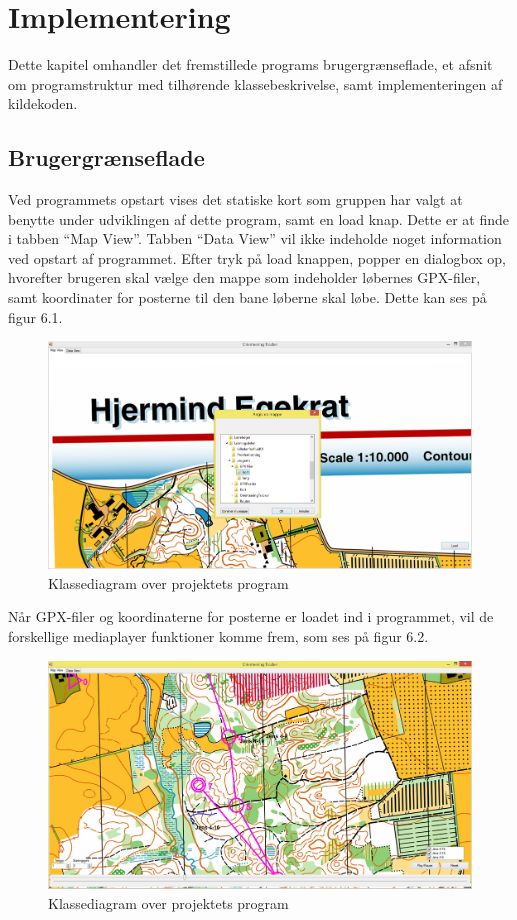 \chapter{Implementering}
Dette kapitel omhandler det fremstillede programs brugergrænseflade, et afsnit om programstruktur med tilhørende klassebeskrivelse, samt implementeringen af kildekoden.

\section{Brugergrænseflade}
Ved programmets opstart vises det statiske kort som gruppen har valgt at benytte under udviklingen af dette program, samt en load knap. Dette er at finde i tabben “Map View”. Tabben “Data View” vil ikke indeholde noget information ved opstart af programmet. Efter tryk på load knappen,	 popper en dialogbox op, hvorefter brugeren skal vælge den mappe som indeholder løbernes GPX-filer, samt koordinater for posterne til den bane løberne skal løbe. Dette kan ses på figur 6.1.

\begin{figure} [h]
	\centering
	\includegraphics[width=1\textwidth]{billeder/MapView1}
	\caption{Klassediagram over projektets program}
\end{figure}

Når GPX-filer og koordinaterne for posterne er loadet ind i programmet, vil de forskellige mediaplayer funktioner komme frem, som ses på figur 6.2.

\begin{figure} [h]
	\centering
	\includegraphics[width=1\textwidth]{billeder/MapView2}
	\caption{Klassediagram over projektets program}
\end{figure}

